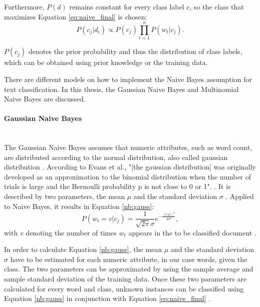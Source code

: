         Furthermore, $P(d)$ remains constant for every class label $c$, so the class that maximizes Equation \eqref{eq:naive_final} is chosen: 
        \begin{equation}
            \label{eq:naive_final}
            P(c_j|d_i)\propto P(c_j)\prod_{t=1}^{n}P(w_{t}|c_j) .
        \end{equation}   
        
        $P(c_j)$ denotes the prior probability and thus the distribution of class labels, which can be obtained using prior knowledge or the training data.
        

        There are different models on how to implement the Naive Bayes assumption for text classification. In this thesis, the Gaussian Naive Bayes and Multinomial Naive Bayes are discussed. 
        
        \paragraph{Gaussian Naive Bayes} \mbox{} \\

        The Gaussian Naive Bayes assumes that numeric attributes, such as word count, are distributed according to the normal distribution, also called gaussian distribution \cite{nb_gauss}. According to Evans et al., "[the gaussian distribution] was originally developed as an approximation to the binomial distribution when the number of trials is large and the Bernoulli probability p is not close to 0 or 1". \cite[p.~143]{evans2011statistical}. It is described by two parameters, the mean $\mu$ and the standard deviation $\sigma$ \cite{evans2011statistical}. Applied to Naive Bayes, it results in Equation \eqref{nb:gauss}:
        \begin{equation}
        \label{nb:gauss}
            P(w_t = v|c_j) = \frac{1}{\sqrt{2\pi}\sigma}e^{-\frac{(v.\mu)^2}{2\sigma^2}},
        \end{equation}
        with $v$ denoting the number of times $w_t$ appears in the to be classified document \cite{nb_gauss}.
        
        In order to calculate Equation \eqref{nb:gauss}, the mean $\mu$ and the standard deviation $\sigma$ have to be estimated for each numeric attribute, in our case words, given the class. The two parameters can be approximated by using the sample average and sample standard deviation of the training data. Once these two parameters are calculated for every word and class, unknown instances can be classified using Equation \eqref{nb:gauss} in conjunction with Equation \eqref{eq:naive_final} \cite{nb_gauss}.
        

